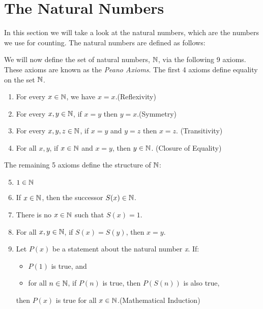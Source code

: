 \newpage
\section{The Natural Numbers}

In this section we will take a look at the natural numbers, which are the numbers we use for counting. 
The natural numbers are defined as follows:
\vspace{\baselineskip}

We will now define the set of natural numbers, \( \mathbb{N} \), via the following 9 axioms. 
These axioms are known as the \emph{Peano Axioms}. The first 4 axioms define equality on 
the set \( \mathbb{N} \).

\begin{enumerate}[label=\Roman*.]

	\item For every \( x \in \mathbb{N} \), we have \( x = x \).\hfill (Reflexivity)
	
	\item For every \( x, y \in \mathbb{N} \), if \( x = y \) then \( y = x \).\hfill (Symmetry)
	
	\item For every \( x, y, z \in \mathbb{N} \), if \( x = y \) and \( y = z \) then \( x = z \).\hfill 
	      (Transitivity)
	
	\item For all \( x, y \), if \( x \in \mathbb{N} \) and \( x = y \), then \( y \in \mathbb{N} \).\hfill 
	      (Closure of Equality)

\end{enumerate}

The remaining 5 axioms define the structure of \( \mathbb{N} \):

\begin{enumerate}[label=\Roman*.]
	\setcounter{enumi}{4}

	\item \( 1 \in \mathbb{N} \)
	
	\item If \( x \in \mathbb{N} \), then the successor \( S(x) \in \mathbb{N} \).
	
	\item There is no \( x \in \mathbb{N} \) such that \( S(x) = 1 \).
	
	\item For all \( x, y \in \mathbb{N} \), if \( S(x) = S(y) \), then \( x = y \).
	
	\item Let \( P(x) \) be a statement about the natural number \emph{x}. If:
	
		\begin{itemize}
	
			\item \( P(1) \) is true, and
	
			\item for all \( n \in \mathbb{N} \), if \( P(n) \) is true, then \( P(S(n)) \) is also true,
	
		\end{itemize}
	
		then \( P(x) \) is true for all \( x \in \mathbb{N} \).\hfill (Mathematical Induction)
\end{enumerate}

